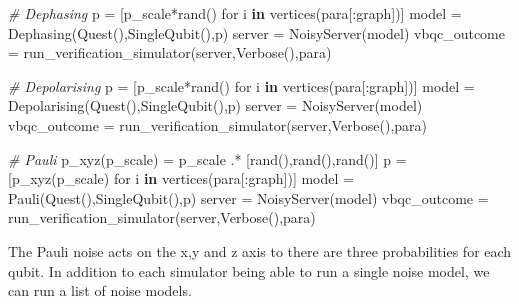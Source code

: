 \documentclass[
]{article}
\newenvironment{Shaded}{}{}
\newcommand{\CommentTok}[1]{\textcolor[rgb]{0.38,0.63,0.69}{\textit{#1}}}
\newcommand{\FunctionTok}[1]{\textcolor[rgb]{0.02,0.16,0.49}{#1}}
\newcommand{\KeywordTok}[1]{\textcolor[rgb]{0.00,0.44,0.13}{\textbf{#1}}}
\newcommand{\NormalTok}[1]{#1}
\newcommand{\OperatorTok}[1]{\textcolor[rgb]{0.40,0.40,0.40}{#1}}
\begin{document}
\begin{Shaded}
\begin{Highlighting}[]
    \CommentTok{\# Dephasing}
\NormalTok{    p }\OperatorTok{=}\NormalTok{ [}\FunctionTok{p\_scale*rand}\NormalTok{() for i }\KeywordTok{in} \FunctionTok{vertices}\NormalTok{(para[}\OperatorTok{:}\NormalTok{graph])]}
\NormalTok{    model }\OperatorTok{=} \FunctionTok{Dephasing}\NormalTok{(}\FunctionTok{Quest}\NormalTok{(),}\FunctionTok{SingleQubit}\NormalTok{(),p)}
\NormalTok{    server }\OperatorTok{=} \FunctionTok{NoisyServer}\NormalTok{(model)}
\NormalTok{    vbqc\_outcome }\OperatorTok{=} \FunctionTok{run\_verification\_simulator}\NormalTok{(server,}\FunctionTok{Verbose}\NormalTok{(),para)}

    \CommentTok{\# Depolarising}
\NormalTok{    p }\OperatorTok{=}\NormalTok{ [}\FunctionTok{p\_scale*rand}\NormalTok{() for i }\KeywordTok{in} \FunctionTok{vertices}\NormalTok{(para[}\OperatorTok{:}\NormalTok{graph])]}
\NormalTok{    model }\OperatorTok{=} \FunctionTok{Depolarising}\NormalTok{(}\FunctionTok{Quest}\NormalTok{(),}\FunctionTok{SingleQubit}\NormalTok{(),p)}
\NormalTok{    server }\OperatorTok{=} \FunctionTok{NoisyServer}\NormalTok{(model)}
\NormalTok{    vbqc\_outcome }\OperatorTok{=} \FunctionTok{run\_verification\_simulator}\NormalTok{(server,}\FunctionTok{Verbose}\NormalTok{(),para)}

    \CommentTok{\# Pauli}
    \FunctionTok{p\_xyz}\NormalTok{(p\_scale) }\OperatorTok{=}\NormalTok{ p\_scale }\OperatorTok{.*}\NormalTok{ [}\FunctionTok{rand}\NormalTok{(),}\FunctionTok{rand}\NormalTok{(),}\FunctionTok{rand}\NormalTok{()]}
\NormalTok{    p }\OperatorTok{=}\NormalTok{ [}\FunctionTok{p\_xyz}\NormalTok{(p\_scale) for i }\KeywordTok{in} \FunctionTok{vertices}\NormalTok{(para[}\OperatorTok{:}\NormalTok{graph])]}
\NormalTok{    model }\OperatorTok{=} \FunctionTok{Pauli}\NormalTok{(}\FunctionTok{Quest}\NormalTok{(),}\FunctionTok{SingleQubit}\NormalTok{(),p)}
\NormalTok{    server }\OperatorTok{=} \FunctionTok{NoisyServer}\NormalTok{(model)}
\NormalTok{    vbqc\_outcome }\OperatorTok{=} \FunctionTok{run\_verification\_simulator}\NormalTok{(server,}\FunctionTok{Verbose}\NormalTok{(),para)}
\end{Highlighting}
\end{Shaded}

The Pauli noise acts on the x,y and z axis to there are three
probabilities for each qubit. In addition to each simulator being able
to run a single noise model, we can run a list of noise models.
\end{document}
